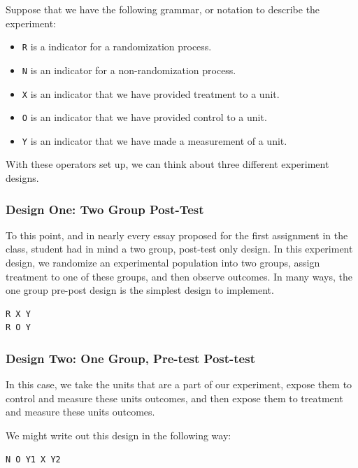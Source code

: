 \documentclass[
]{article}
\providecommand{\tightlist}{%
  \setlength{\itemsep}{0pt}\setlength{\parskip}{0pt}}
\theoremstyle{definition}
\theoremstyle{definition}
\theoremstyle{definition}
\theoremstyle{definition}
\theoremstyle{remark}
\begin{document}
Suppose that we have the following grammar, or notation to describe the experiment:

\begin{itemize}
\tightlist
\item
  \texttt{R} is a indicator for a randomization process.
\item
  \texttt{N} is an indicator for a non-randomization process.
\item
  \texttt{X} is an indicator that we have provided treatment to a unit.
\item
  \texttt{O} is an indicator that we have provided control to a unit.
\item
  \texttt{Y} is an indicator that we have made a measurement of a unit.
\end{itemize}

With these operators set up, we can think about three different experiment designs.

\subsubsection{Design One: Two Group Post-Test}\label{design-one-two-group-post-test}

To this point, and in nearly every essay proposed for the first assignment in the class, student had in mind a two group, post-test only design. In this experiment design, we randomize an experimental population into two groups, assign treatment to one of these groups, and then observe outcomes. In many ways, the one group pre-post design is the simplest design to implement.

\begin{verbatim}
R X Y 
R O Y
\end{verbatim}

\subsubsection{Design Two: One Group, Pre-test Post-test}\label{design-two-one-group-pre-test-post-test}

In this case, we take the units that are a part of our experiment, expose them to control and measure these units outcomes, and then expose them to treatment and measure these units outcomes.

We might write out this design in the following way:

\begin{verbatim}
N O Y1 X Y2
\end{verbatim}
\end{document}
